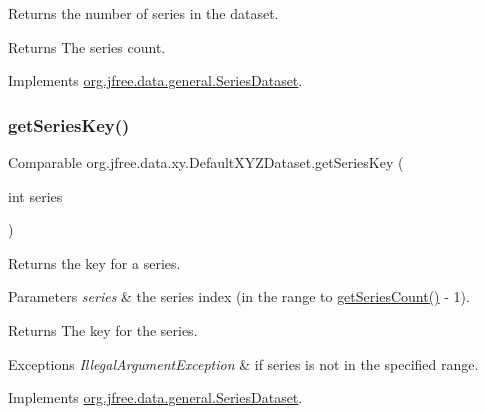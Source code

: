 Returns the number of series in the dataset.

\begin{DoxyReturn}{Returns}
The series count. 
\end{DoxyReturn}


Implements \mbox{\hyperlink{interfaceorg_1_1jfree_1_1data_1_1general_1_1_series_dataset_a84fe822f5918f941d9de1ed1b73c9f58}{org.\+jfree.\+data.\+general.\+Series\+Dataset}}.

\mbox{\label{classorg_1_1jfree_1_1data_1_1xy_1_1_default_x_y_z_dataset_a836fc96c5df3cb865401db79238daa7a}} 
\subsubsection{\texorpdfstring{get\+Series\+Key()}{getSeriesKey()}}
{\footnotesize\ttfamily Comparable org.\+jfree.\+data.\+xy.\+Default\+X\+Y\+Z\+Dataset.\+get\+Series\+Key (\begin{DoxyParamCaption}\item[{int}]{series }\end{DoxyParamCaption})}

Returns the key for a series.


\begin{DoxyParams}{Parameters}
{\em series} & the series index (in the range {} to {\ttfamily \mbox{\hyperlink{classorg_1_1jfree_1_1data_1_1xy_1_1_default_x_y_z_dataset_a115138a06afdc19d3526ef73fabf578e}{get\+Series\+Count()}} -\/ 1}).\\
\hline
\end{DoxyParams}
\begin{DoxyReturn}{Returns}
The key for the series.
\end{DoxyReturn}

\begin{DoxyExceptions}{Exceptions}
{\em Illegal\+Argument\+Exception} & if {\ttfamily series} is not in the specified range. \\
\hline
\end{DoxyExceptions}


Implements \mbox{\hyperlink{interfaceorg_1_1jfree_1_1data_1_1general_1_1_series_dataset_a60488892b2314a05a012999e26a74178}{org.\+jfree.\+data.\+general.\+Series\+Dataset}}.

